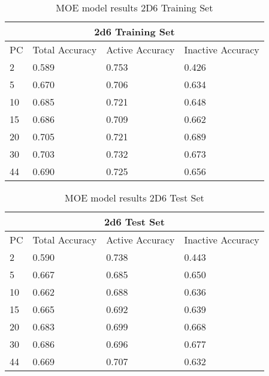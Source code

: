\begin{table}[h]
\begin{tabular}{|l|l|l|l|}
\hline
\multicolumn{4}{|c|}{2d6 Training Set}                                                                \\ \hline
PC & Total Accuracy & Active Accuracy & Inactive Accuracy \\ \hline
2  & 0.589          & 0.753           & 0.426   \\ \hline
5  & 0.670          & 0.706           & 0.634   \\ \hline
10 & 0.685          & 0.721           & 0.648   \\ \hline
15 & 0.686          & 0.709           & 0.662   \\ \hline
20 & 0.705          & 0.721           & 0.689   \\ \hline
30 & 0.703          & 0.732           & 0.673   \\ \hline
44 & 0.690          & 0.725           & 0.656   \\ \hline
\end{tabular}
\caption{MOE model results 2D6 Training Set}
\end{table}


\begin{table}[h]
\begin{tabular}{|l|l|l|l|}
\hline
\multicolumn{4}{|c|}{2d6 Test Set}                                                                    \\ \hline
PC & Total Accuracy & Active Accuracy & Inactive Accuracy \\ \hline
2  & 0.590          & 0.738           & 0.443    \\ \hline
5  & 0.667          & 0.685           & 0.650    \\ \hline
10 & 0.662          & 0.688           & 0.636    \\ \hline
15 & 0.665          & 0.692           & 0.639    \\ \hline
20 & 0.683          & 0.699           & 0.668    \\ \hline
30 & 0.686          & 0.696           & 0.677    \\ \hline
44 & 0.669          & 0.707           & 0.632    \\ \hline
\end{tabular}
\caption{MOE model results 2D6 Test Set}
\end{table}


